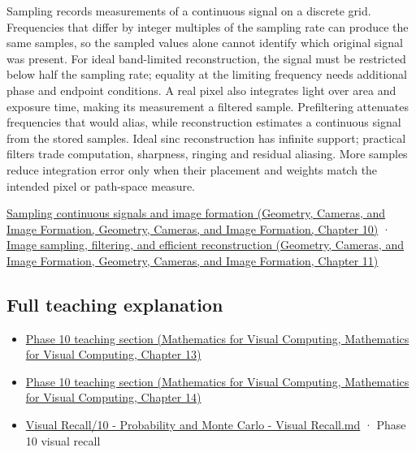 Sampling records measurements of a continuous signal on a discrete grid. Frequencies that differ by integer multiples of the sampling rate can produce the same samples, so the sampled values alone cannot identify which original signal was present. For ideal band-limited reconstruction, the signal must be restricted below half the sampling rate; equality at the limiting frequency needs additional phase and endpoint conditions. A real pixel also integrates light over area and exposure time, making its measurement a filtered sample. Prefiltering attenuates frequencies that would alias, while reconstruction estimates a continuous signal from the stored samples. Ideal sinc reconstruction has infinite support; practical filters trade computation, sharpness, ringing and residual aliasing. More samples reduce integration error only when their placement and weights match the intended pixel or path-space measure.

\href{../03-Geometry-Cameras-and-Image-Formation/main.pdf\#nameddest=03-visual-computing-i-ch003-sampling-continuous-signals-and-image-formation}{Sampling continuous signals and image formation (Geometry, Cameras, and Image Formation, Geometry, Cameras, and Image Formation, Chapter 10)} · \href{../03-Geometry-Cameras-and-Image-Formation/main.pdf\#nameddest=03-visual-computing-i-ch004-image-sampling-filtering-and-efficient-reconstruction}{Image sampling, filtering, and efficient reconstruction (Geometry, Cameras, and Image Formation, Geometry, Cameras, and Image Formation, Chapter 11)}

\subsection{Full teaching explanation}\label{appendix-6a7869dd79a6-full-teaching-explanation}

\begin{itemize}
\tightlist
\item
  \href{../02-Mathematics-for-Visual-Computing/main.pdf\#nameddest=02-foundations-ii-ch029-a-computer-produces-deterministic-pseudorandom-sequences}{Phase 10 teaching section (Mathematics for Visual Computing, Mathematics for Visual Computing, Chapter 13)}
\item
  \href{../02-Mathematics-for-Visual-Computing/main.pdf\#nameddest=02-foundations-ii-ch030-monte-carlo-estimates-trade-computation-for-uncertainty}{Phase 10 teaching section (Mathematics for Visual Computing, Mathematics for Visual Computing, Chapter 14)}
\item
  \hyperref[appendix-cb5af353ef77]{Visual Recall/10 - Probability and Monte Carlo - Visual Recall.md} · Phase 10 visual recall
\end{itemize}
